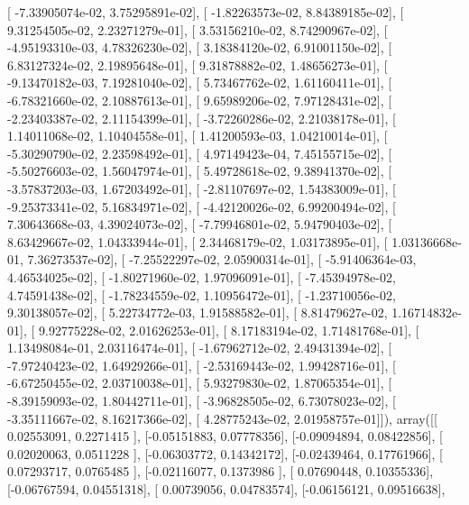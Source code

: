 \documentclass{article}
\begin{document}
       [ -7.33905074e-02,   3.75295891e-02],
       [ -1.82263573e-02,   8.84389185e-02],
       [  9.31254505e-02,   2.23271279e-01],
       [  3.53156210e-02,   8.74290967e-02],
       [ -4.95193310e-03,   4.78326230e-02],
       [  3.18384120e-02,   6.91001150e-02],
       [  6.83127324e-02,   2.19895648e-01],
       [  9.31878882e-02,   1.48656273e-01],
       [ -9.13470182e-03,   7.19281040e-02],
       [  5.73467762e-02,   1.61160411e-01],
       [ -6.78321660e-02,   2.10887613e-01],
       [  9.65989206e-02,   7.97128431e-02],
       [ -2.23403387e-02,   2.11154399e-01],
       [ -3.72260286e-02,   2.21038178e-01],
       [  1.14011068e-02,   1.10404558e-01],
       [  1.41200593e-03,   1.04210014e-01],
       [ -5.30290790e-02,   2.23598492e-01],
       [  4.97149423e-04,   7.45155715e-02],
       [ -5.50276603e-02,   1.56047974e-01],
       [  5.49728618e-02,   9.38941370e-02],
       [ -3.57837203e-03,   1.67203492e-01],
       [ -2.81107697e-02,   1.54383009e-01],
       [ -9.25373341e-02,   5.16834971e-02],
       [ -4.42120026e-02,   6.99200494e-02],
       [  7.30643668e-03,   4.39024073e-02],
       [ -7.79946801e-02,   5.94790403e-02],
       [  8.63429667e-02,   1.04333944e-01],
       [  2.34468179e-02,   1.03173895e-01],
       [  1.03136668e-01,   7.36273537e-02],
       [ -7.25522297e-02,   2.05900314e-01],
       [ -5.91406364e-03,   4.46534025e-02],
       [ -1.80271960e-02,   1.97096091e-01],
       [ -7.45394978e-02,   4.74591438e-02],
       [ -1.78234559e-02,   1.10956472e-01],
       [ -1.23710056e-02,   9.30138057e-02],
       [  5.22734772e-03,   1.91588582e-01],
       [  8.81479627e-02,   1.16714832e-01],
       [  9.92775228e-02,   2.01626253e-01],
       [  8.17183194e-02,   1.71481768e-01],
       [  1.13498084e-01,   2.03116474e-01],
       [ -1.67962712e-02,   2.49431394e-02],
       [ -7.97240423e-02,   1.64929266e-01],
       [ -2.53169443e-02,   1.99428716e-01],
       [ -6.67250455e-02,   2.03710038e-01],
       [  5.93279830e-02,   1.87065354e-01],
       [ -8.39159093e-02,   1.80442711e-01],
       [ -3.96828505e-02,   6.73078023e-02],
       [ -3.35111667e-02,   8.16217366e-02],
       [  4.28775243e-02,   2.01958757e-01]]), array([[ 0.02553091,  0.2271415 ],
       [-0.05151883,  0.07778356],
       [-0.09094894,  0.08422856],
       [ 0.02020063,  0.0511228 ],
       [-0.06303772,  0.14342172],
       [-0.02439464,  0.17761966],
       [ 0.07293717,  0.0765485 ],
       [-0.02116077,  0.1373986 ],
       [ 0.07690448,  0.10355336],
       [-0.06767594,  0.04551318],
       [ 0.00739056,  0.04783574],
       [-0.06156121,  0.09516638],
\end{document}
